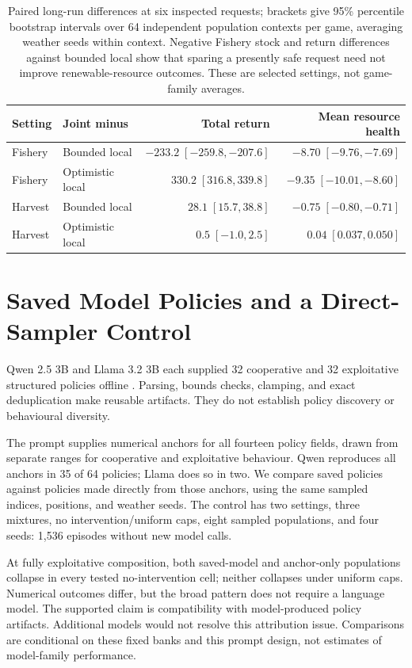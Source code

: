 \documentclass[10pt]{article}
\begin{document}
\begin{table}[t]
\centering\small
\begin{tabular}{llrr}
\toprule
Setting & Joint minus & Total return & Mean resource health\\
\midrule
Fishery & Bounded local & $-233.2\;[-259.8,-207.6]$ & $-8.70\;[-9.76,-7.69]$\\
Fishery & Optimistic local & $330.2\;[316.8,339.8]$ & $-9.35\;[-10.01,-8.60]$\\
Harvest & Bounded local & $28.1\;[15.7,38.8]$ & $-0.75\;[-0.80,-0.71]$\\
Harvest & Optimistic local & $0.5\;[-1.0,2.5]$ & $0.04\;[0.037,0.050]$\\
\bottomrule
\end{tabular}
\caption{Paired long-run differences at six inspected requests; brackets give 95\% percentile bootstrap intervals over 64 independent population contexts per game, averaging weather seeds within context. Negative Fishery stock and return differences against bounded local show that sparing a presently safe request need not improve renewable-resource outcomes. These are selected settings, not game-family averages.}
\label{tab:longrun-paired}
\end{table}

\section{Saved Model Policies and a Direct-Sampler Control}
Qwen 2.5 3B and Llama 3.2 3B each supplied 32 cooperative and 32 exploitative structured policies offline \citep{yang2024qwen25,meta2024llama32}. Parsing, bounds checks, clamping, and exact deduplication make reusable artifacts. They do not establish policy discovery or behavioural diversity.

The prompt supplies numerical anchors for all fourteen policy fields, drawn from separate ranges for cooperative and exploitative behaviour. Qwen reproduces all anchors in 35 of 64 policies; Llama does so in two. We compare saved policies against policies made directly from those anchors, using the same sampled indices, positions, and weather seeds. The control has two settings, three mixtures, no intervention/uniform caps, eight sampled populations, and four seeds: 1,536 episodes without new model calls.

At fully exploitative composition, both saved-model and anchor-only populations collapse in every tested no-intervention cell; neither collapses under uniform caps. Numerical outcomes differ, but the broad pattern does not require a language model. The supported claim is compatibility with model-produced policy artifacts. Additional models would not resolve this attribution issue. Comparisons are conditional on these fixed banks and this prompt design, not estimates of model-family performance.
\end{document}
